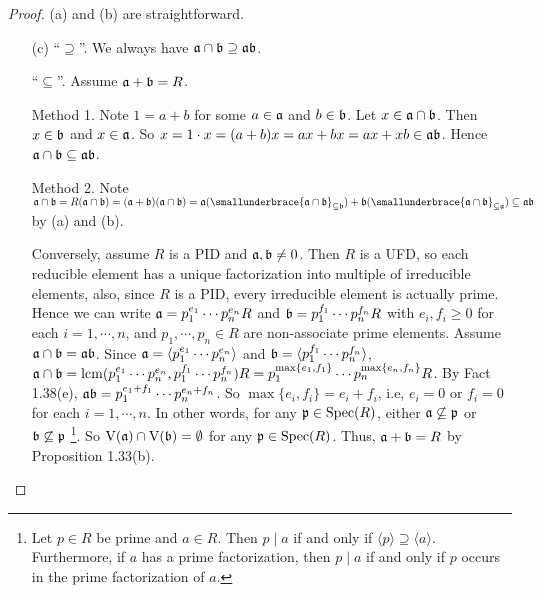 \begin{proof}
    (a) and (b) are straightforward.
    \begin{enumerate}
        \item [(c)]
            ``$\supseteq$''. We always have $\mathfrak{a} \cap \mathfrak{b} \supseteq \mathfrak{a} \mathfrak{b}$. \par 
            ``$\subseteq$''. Assume $\mathfrak{a} + \mathfrak{b} = R$.  \par 
            Method 1. Note $1 = a+b$ for some $a \in \mathfrak{a}$ and $b \in \mathfrak{b}$. Let $x \in \mathfrak{a} \cap \mathfrak{b}$. Then $x \in \mathfrak{b}$ and $x \in \mathfrak{a}$. So $x = 1 \cdot x = (a+b)x = ax + bx = ax + xb \in \operatorname{\mathfrak{a} \mathfrak{b}}$. Hence $\mathfrak{a} \cap \mathfrak{b} \subseteq \mathfrak{a} \mathfrak{b}$. \par 
            Method 2. Note $\ffa \cap \ffb = R(\ffa \cap \ffb) = (\ffa + \ffb)(\ffa \cap \ffb) = \ffa(\smallunderbrace{\ffa \cap \ffb}_{\subseteq \ffb}) + \ffb(\smallunderbrace{\ffa \cap \ffb}_{\subseteq \ffa}) \subseteq \ffa \ffb$ by (a) and (b). \par
            Conversely, assume $R$ is a PID and $\mathfrak{a},\mathfrak{b} \neq 0$. Then $R$ is a UFD, so each reducible element has a unique factorization into multiple of irreducible elements, also, since $R$ is a PID, every irreducible element is actually prime.  Hence we can write $\mathfrak{a} = p_1^{e_1} \cdots p_n^{e_n} R$ and $\mathfrak{b} = p_1^{f_1} \cdots p_n^{f_n}R$ with $e_i,f_i \geq 0$ for each $i = 1,\cdots,n$, and $p_1,\cdots,p_n \in R$ are non-associate prime elements. Assume $\mathfrak{a} \cap \mathfrak{b} = \mathfrak{a} \mathfrak{b}$. Since $\mathfrak{a} = \langle p_1^{e_1} \cdots p_n^{e_n} \rangle$ and $\mathfrak{b} = \langle p_1^{f_1} \cdots p_n^{f_n} \rangle$, $\mathfrak{a} \cap \mathfrak{b} = \operatorname{lcm}(p_1^{e_1} \cdots p_n^{e_n},p_1^{f_1} \cdots p_n^{f_n})R = p_1^{\max\{e_1,f_1\}} \cdots p_n^{\max\{e_n,f_n\}}R$. By Fact 1.38(e), $\mathfrak{a}\mathfrak{b} = p_1^{e_1+f_1} \cdots p_n^{e_n+f_n}$. So $\max\{e_i,f_i\} = e_i + f_i$, i.e, $e_i = 0$ or $f_i = 0$ for each $i = 1,\cdots,n$. In other words, for any $\mathfrak{p} \in \operatorname{Spec}(R)$, either $\mathfrak{a} \not \subseteq \mathfrak{p}$ or $\mathfrak{b} \not \subseteq \mathfrak{p}$ \footnote[2]{Let $p \in R$ be prime and $a \in R$. Then $p \mid a$ if and only if $\langle p \rangle \supseteq \langle a \rangle$. Furthermore, if $a$ has a prime factorization, then $p \mid a$ if and only if $p$ occurs in the prime factorization of $a$.}. So $\operatorname{V}(\mathfrak{a}) \cap \operatorname{V}(\mathfrak{b}) = \emptyset$ for any $\mathfrak{p} \in \operatorname{Spec}(R)$. Thus, $\mathfrak{a} + \mathfrak{b} = R$ by Proposition 1.33(b). \qedhere
    \end{enumerate}
\end{proof}

